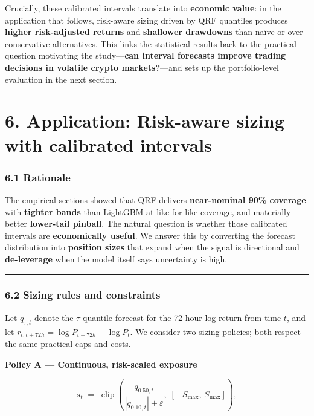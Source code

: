 \documentclass[
  a4paper,
  DIV=11,
  numbers=noendperiod]{scrreprt}
\begin{document}
Crucially, these calibrated intervals translate into \textbf{economic
value}: in the application that follows, risk-aware sizing driven by QRF
quantiles produces \textbf{higher risk-adjusted returns} and
\textbf{shallower drawdowns} than naïve or over-conservative
alternatives. This links the statistical results back to the practical
question motivating the study---\textbf{can interval forecasts improve
trading decisions in volatile crypto markets?}---and sets up the
portfolio-level evaluation in the next section.


\chapter{6. Application: Risk-aware sizing with calibrated
intervals}\label{application-risk-aware-sizing-with-calibrated-intervals}

\subsection{6.1 Rationale}\label{rationale}

The empirical sections showed that QRF delivers \textbf{near-nominal
90\% coverage} with \textbf{tighter bands} than LightGBM at
like-for-like coverage, and materially better \textbf{lower-tail
pinball}. The natural question is whether those calibrated intervals are
\textbf{economically useful}. We answer this by converting the forecast
distribution into \textbf{position sizes} that expand when the signal is
directional and \textbf{de-leverage} when the model itself says
uncertainty is high.

\begin{center}\rule{0.5\linewidth}{0.5pt}\end{center}

\subsection{6.2 Sizing rules and
constraints}\label{sizing-rules-and-constraints}

Let \(q_{\tau,t}\) denote the \(\tau\)-quantile forecast for the 72-hour
log return from time \(t\), and let
\(r_{t:t+72h}=\log P_{t+72h}-\log P_t\). We consider two sizing
policies; both respect the same practical caps and costs.

\textbf{Policy A --- Continuous, risk-scaled exposure}

\[
s_t \;=\; \operatorname{clip}\!\left(\frac{q_{0.50,t}}{|q_{0.10,t}|+\varepsilon},\;\left[-S_{\max},\,S_{\max}\right]\right),
\]
\end{document}
